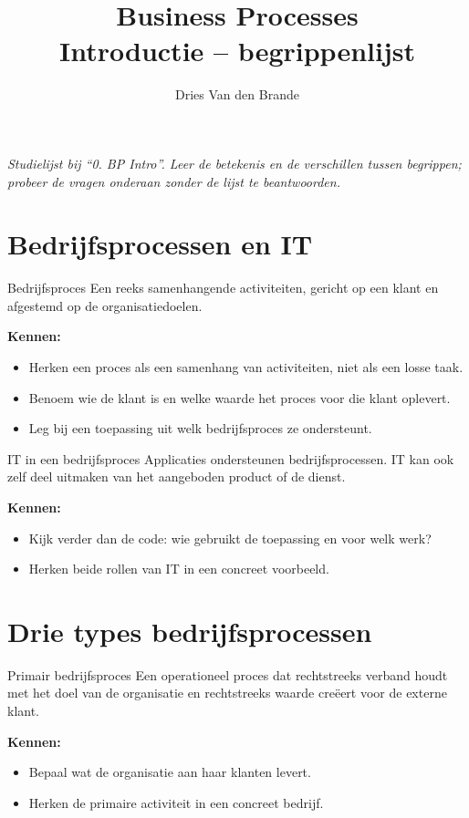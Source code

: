 \documentclass[11pt,a4paper]{article}
\title{Business Processes\\Introductie -- begrippenlijst}
\author{Dries Van den Brande}
\date{}
\newcommand{\kennen}{\par\smallskip\textbf{Kennen:}}
\begin{document}
\maketitle

\noindent\textit{Studielijst bij ``0. BP Intro''. Leer de betekenis en de
verschillen tussen begrippen; probeer de vragen onderaan zonder de lijst te
beantwoorden.}

\section{Bedrijfsprocessen en IT}

\begin{definition}{Bedrijfsproces}
Een reeks samenhangende activiteiten, gericht op een klant en afgestemd op de
organisatiedoelen.
\kennen
\begin{itemize}
  \item Herken een proces als een samenhang van activiteiten, niet als een losse taak.
  \item Benoem wie de klant is en welke waarde het proces voor die klant oplevert.
  \item Leg bij een toepassing uit welk bedrijfsproces ze ondersteunt.
\end{itemize}
\end{definition}

\begin{definition}{IT in een bedrijfsproces}
Applicaties ondersteunen bedrijfsprocessen. IT kan ook zelf deel uitmaken van
het aangeboden product of de dienst.
\kennen
\begin{itemize}
  \item Kijk verder dan de code: wie gebruikt de toepassing en voor welk werk?
  \item Herken beide rollen van IT in een concreet voorbeeld.
\end{itemize}
\end{definition}

\section{Drie types bedrijfsprocessen}

\begin{definition}{Primair bedrijfsproces}
Een operationeel proces dat rechtstreeks verband houdt met het doel van de
organisatie en rechtstreeks waarde cre\"eert voor de externe klant.
\kennen
\begin{itemize}
  \item Bepaal wat de organisatie aan haar klanten levert.
  \item Herken de primaire activiteit in een concreet bedrijf.
\end{itemize}
\end{definition}
\end{document}
